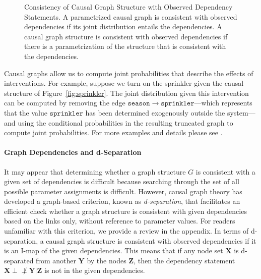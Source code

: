 \documentclass{elsarticle}%
\newcommand{\set}[1]{\mathbf{#1}}
\newcommand{\dep}{\ensuremath{{\perp{}\!\!\!\!\!\!\!\not  \perp{}}}}
\newcommand{\G}{G}
\newcommand{\sprinkler}{\mathtt{sprinkler}}
\newcommand{\season}{\mathtt{season}}
\begin{document}
\begin{figure}[hbtp]
\centering
{}
\caption{Consistency of Causal Graph Structure with Observed Dependency Statements. A parametrized causal graph is consistent with observed dependencies if its joint distribution entails the dependencies. A causal graph structure is consistent with observed dependencies if there is a parametrization of the structure that is consistent with the dependencies.}%
\label{fig:consistency}%
\end{figure}
Causal graphs allow us to compute joint probabilities that describe the effects of interventions. For example, suppose we turn on the sprinkler given the causal structure of Figure~\ref{fig:sprinkler}. The joint distribution given this intervention can be computed by removing the edge $\season \rightarrow \sprinkler$---which represents that the value $\sprinkler$ has been determined exogenously outside the system---and using the conditional probabilities in the resulting truncated graph to compute joint probabilities. For more examples and details please see \cite{pearl00:_causal}.

\paragraph{Graph Dependencies and d-Separation}
It may appear that determining whether a graph structure $\G$ is consistent with a given set of dependencies is difficult because searching through the set of all possible parameter assignments is difficult. However, causal graph theory has developed a graph-based criterion, known as {\em d-separation}, that facilitates an efficient check whether a graph structure is consistent with given dependencies based on the links only, without reference to parameter values. For readers unfamiliar with this criterion, we provide a review in the appendix. In terms of d-separation, a causal graph structure is consistent with observed dependencies if it is an I-map of the given dependencies. This means that if any node set $ \set{X}$ is d-separated from another $ \set{Y}$ by the nodes $\set{Z}$, then the dependency statement $\set{X} \dep \set{Y}|\set{Z}$ is not in the given dependencies. 
\end{document}
